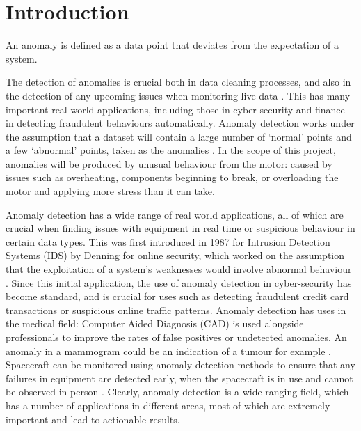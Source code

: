 \section{Introduction}

An anomaly is defined as a data point that deviates from the expectation of a system.

The detection of anomalies is crucial both in data cleaning processes, and also in the detection of any upcoming issues when monitoring live data \cite{Akouemo2016948}. This has many important real world applications, including those in cyber-security and finance in detecting fraudulent behaviours automatically. Anomaly detection works under the assumption that a dataset will contain a large number of `normal' points and a few `abnormal' points, taken as the anomalies \cite{Pimentel2014215}. In the scope of this project, anomalies will be produced by unusual behaviour from the motor: caused by issues such as overheating, components beginning to break, or overloading the motor and applying more stress than it can take. 

Anomaly detection has a wide range of real world applications, all of which are crucial when finding issues with equipment in real time or suspicious behaviour in certain data types. This was first introduced in 1987 for Intrusion Detection Systems (IDS) by Denning for online security, which worked on the assumption that the exploitation of a system's weaknesses would involve abnormal behaviour \cite{1702202}. Since this initial application, the use of anomaly detection in cyber-security has become standard, and is crucial for uses such as detecting fraudulent credit card transactions or suspicious online traffic patterns. Anomaly detection has uses in the medical field: Computer Aided Diagnosis (CAD) is used alongside professionals to improve the rates of false positives or undetected anomalies. An anomaly in a mammogram could be an indication of a tumour for example \cite{Sajda2003AMP}. Spacecraft can be monitored using anomaly detection methods to ensure that any failures in equipment are detected early, when the spacecraft is in use and cannot be observed in person \cite{Fujimaki:2005:ASA:1081870.1081917}. Clearly, anomaly detection is a wide ranging field, which has a number of applications in different areas, most of which are extremely important and lead to actionable results.

